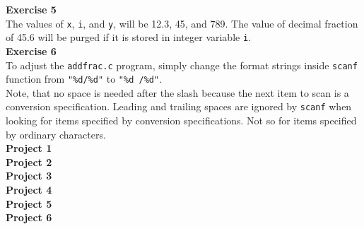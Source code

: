 \documentclass[a4paper, 10pt]{article}
\begin{document}
\textbf{Exercise 5} \\
The values of \texttt{x}, \texttt{i}, and \texttt{y}, will be 12.3, 45, and 789. The value of decimal fraction of 45.6 will be purged if it is stored in integer variable \texttt{i}. \\

\textbf{Exercise 6} \\
To adjust the \texttt{addfrac.c} program, simply change the format strings inside \texttt{scanf} function from \lstinline!"%d/%d"! to \lstinline!"%d /%d"!. \\

Note, that no space is needed after the slash because the next item to scan is a conversion specification. Leading and trailing spaces are ignored by \texttt{scanf} when looking for items specified by conversion specifications. Not so for items specified by ordinary characters.\\

\textbf{Project 1} \\


\textbf{Project 2} \\


\textbf{Project 3} \\


\textbf{Project 4} \\


\textbf{Project 5} \\


\textbf{Project 6} \\

\end{document}
